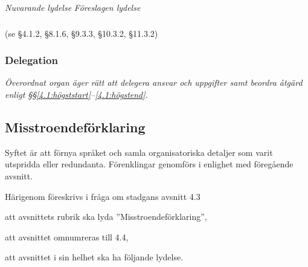 \documentclass{article}
\newenvironment{lydelse}
    {\begin{paracol}{2}%
        \emph{Nuvarande lydelse}%
        \switchcolumn%
        \emph{Föreslagen lydelse}%
    \end{paracol}%
    \begin{enumerate}[label=\thesubsection.\arabic*]%
    \begin{paracol}{2}%
    }{\end{paracol}\end{enumerate}}
\begin{document}
\begin{lydelse}
  \switchcolumn*
    \subsubsection*{}
    \item[] (se \S 4.1.2, \S 8.1.6, \S 9.3.3, \S 10.3.2, \S 11.3.2)

  \switchcolumn
    \subsubsection*{Delegation} 
    \item \emph{Överordnat organ äger rätt att delegera ansvar och uppgifter
        samt beordra åtgärd enligt \S\S\ref{4.1:högststart}--\ref{4.1:högstend}.} 
      \label{4.x:delegation}
  
\end{lydelse}

\subsection{Misstroendeförklaring}
Syftet är att förnya språket och samla organisatoriska detaljer som varit
utspridda eller redundanta.
Förenklingar genomförs i enlighet med föregående avsnitt.

Härigenom föreskrivs i fråga om stadgans avsnitt 4.3
\begin{dels}
    \item att avsnittets rubrik ska lyda ''Misstroendeförklaring'',
    \item att avsnittet omnumreras till 4.4,
    \item att avsnittet i sin helhet ska ha följande lydelse.
\end{dels}
\end{document}
